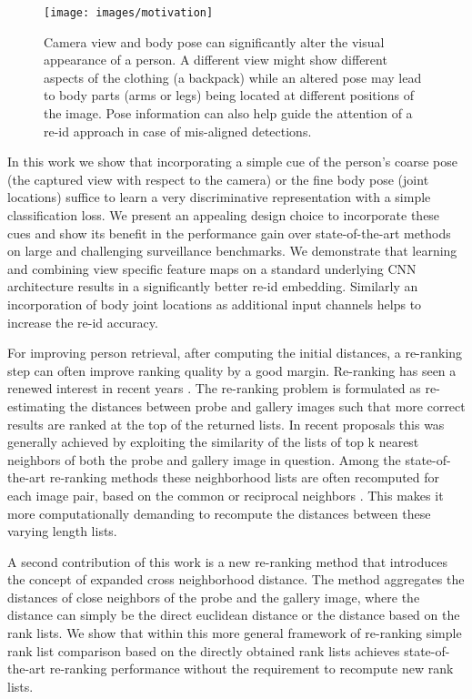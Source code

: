 \documentclass[10pt,twocolumn,letterpaper]{article}
\begin{document}
\begin{figure}
\centering
\texttt{[image: images/motivation]}
\caption{Camera view and body pose can significantly alter the visual appearance of a person. A different view might show different aspects of the clothing (\eg a backpack) while an altered pose may lead to body parts (\eg arms or legs) being located at different positions of the image. Pose information can also help guide the attention of a re-id approach in case of mis-aligned detections.}
\label{fig:intro}
\vspace{-.5cm}
\end{figure}

In this work we show that incorporating a simple cue of the person's coarse pose (\ie the captured view with respect to the camera) or the fine body pose (\ie joint locations) suffice to learn a very discriminative representation with a simple classification loss. We present an appealing design choice to incorporate these cues and show its benefit in the performance gain over state-of-the-art methods on large and challenging surveillance benchmarks. We demonstrate that learning and combining view specific feature maps on a standard underlying CNN architecture results in a significantly better re-id embedding. Similarly an incorporation of body joint locations as additional input channels helps to increase the re-id accuracy.

For improving person retrieval, after computing the initial distances, a re-ranking step can often improve ranking quality by a good margin. Re-ranking has seen a renewed interest in recent years \cite{ma2014query,garcia2015person,leng2015person,ye2016person,zhong2017re}. The re-ranking problem is formulated as re-estimating the distances between probe and gallery images such that more correct results are ranked at the top of the returned lists. In recent proposals this was generally achieved by exploiting the similarity of the lists of top k nearest neighbors of both the probe and gallery image in question. Among the state-of-the-art re-ranking methods these neighborhood lists are often recomputed for each image pair, based on the common or reciprocal neighbors \cite{ye2015coupled,bai2016sparse,zhong2017re}. This makes it more computationally demanding to recompute the distances between these varying length lists.

A second contribution of this work is a new re-ranking method that introduces the concept of expanded cross neighborhood distance. The method aggregates the distances of close neighbors of the probe and the gallery image, where the distance can simply be the direct euclidean distance or the distance based on the rank lists. We show that within this more general framework of re-ranking simple rank list comparison based on the directly obtained rank lists achieves state-of-the-art re-ranking performance without the requirement to recompute new rank lists.
\end{document}
